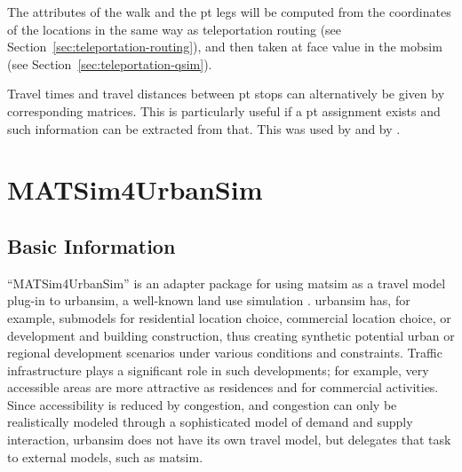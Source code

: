 The attributes of the walk and the \gls{pt} legs will be computed from the coordinates of the locations in the same way as teleportation routing (see Section~\ref{sec:teleportation-routing}), and then taken at face value in the \gls{mobsim} (see Section~\ref{sec:teleportation-qsim}).

Travel times and travel distances between \gls{pt} stops can alternatively be given by corresponding matrices.  This is particularly useful if a \gls{pt} assignment exists and such information can be extracted from that.  This was used by \citet{RoederNagel2013SketchPlanningBrussels} and by \citet{ZoelligRenner_PhDThesis_2014}.

\section{MATSim4UrbanSim}
\label{sec:matsim4urbansim}



\subsection{Basic Information}

``MATSim4UrbanSim'' is an adapter package for using \gls{matsim} as a travel model plug-in to \gls{urbansim}, a well-known land use simulation \citep[e.g.][see \url{http://www.urbansim.org}]{WaddellEtc2003UrbanSim}.
\gls{urbansim} has, for example, submodels for residential location choice, commercial location choice, or development and building construction, thus creating synthetic  potential urban or regional development scenarios under various conditions and constraints. 
Traffic infrastructure plays a significant role in such developments; for example, very accessible areas are more attractive as residences and for commercial activities. 
Since accessibility is reduced by congestion, and congestion can only be realistically modeled through a sophisticated model of demand and supply interaction, \gls{urbansim} does not have its own travel model, but delegates that task to external models, such as \gls{matsim}.

